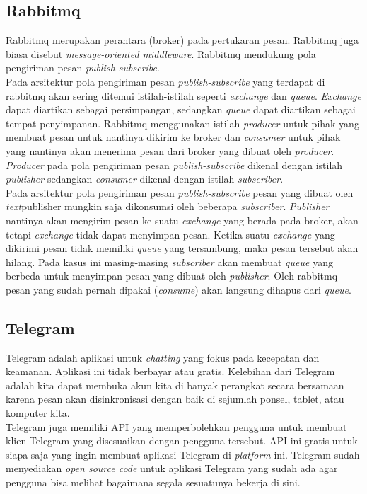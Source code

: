 \subsection{Rabbitmq}
\tab Rabbitmq merupakan perantara (broker) pada pertukaran pesan. Rabbitmq juga biasa disebut \textit{message-oriented middleware}. Rabbitmq mendukung pola pengiriman pesan \textit{publish-subscribe}.\\
\tab Pada arsitektur pola pengiriman pesan \textit{publish-subscribe} yang terdapat di rabbitmq akan sering ditemui istilah-istilah seperti \textit{exchange} dan \textit{queue}. \textit{Exchange} dapat diartikan sebagai persimpangan, sedangkan \textit{queue} dapat diartikan sebagai tempat penyimpanan. Rabbitmq menggunakan istilah \textit{producer} untuk pihak yang membuat pesan untuk nantinya dikirim ke broker dan \textit{consumer} untuk pihak yang nantinya akan menerima pesan dari broker yang dibuat oleh \textit{producer}. \textit{Producer} pada pola pengiriman pesan \textit{publish-subscribe} dikenal dengan istilah \textit{publisher} sedangkan \textit{consumer} dikenal dengan istilah \textit{subscriber}.\\
\tab Pada arsitektur pola pengiriman pesan \textit{publish-subscribe} pesan yang dibuat oleh \textit{text}publisher mungkin saja dikonsumsi oleh beberapa \textit{subscriber}. \textit{Publisher} nantinya akan mengirim pesan ke suatu \textit{exchange} yang berada pada broker, akan tetapi \textit{exchange} tidak dapat menyimpan pesan. Ketika suatu \textit{exchange} yang dikirimi pesan tidak memiliki \textit{queue} yang tersambung, maka pesan tersebut akan hilang. Pada kasus ini masing-masing \textit{subscriber} akan membuat \textit{queue} yang berbeda untuk menyimpan pesan yang dibuat oleh \textit{publisher}. Oleh rabbitmq pesan yang sudah pernah dipakai (\textit{consume}) akan langsung dihapus dari \textit{queue}.


\subsection{Telegram}
\tab Telegram adalah aplikasi untuk \textit{chatting} yang fokus pada kecepatan dan keamanan. Aplikasi ini tidak berbayar atau gratis. Kelebihan dari Telegram adalah kita dapat membuka akun kita di banyak perangkat secara bersamaan karena pesan akan disinkronisasi dengan baik di sejumlah ponsel, tablet, atau komputer kita.\\
\tab Telegram juga memiliki API yang memperbolehkan pengguna untuk membuat klien Telegram yang disesuaikan dengan pengguna tersebut. API ini gratis untuk siapa saja yang ingin membuat aplikasi Telegram di \textit{platform} ini. Telegram sudah menyediakan \textit{open source code} untuk aplikasi Telegram yang sudah ada agar pengguna bisa melihat bagaimana segala sesuatunya bekerja di sini.